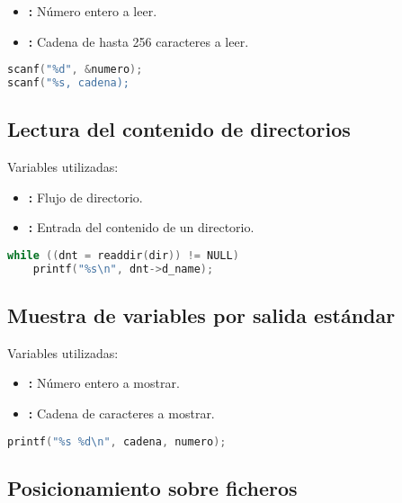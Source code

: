 \begin{itemize}
	\item{}\textbf{:} Número entero a leer.
	\item{}\textbf{:} Cadena de hasta 256 caracteres a leer.
\end{itemize}

\begin{lstlisting}[language=C]
scanf("%d", &numero);
scanf("%s, cadena);
\end{lstlisting}

\subsection{Lectura del contenido de directorios}

Variables utilizadas:

\begin{itemize}
	\item{}\textbf{:} Flujo de directorio.
	\item{}\textbf{:} Entrada del contenido de un directorio.
\end{itemize}

\begin{lstlisting}[language=C]
while ((dnt = readdir(dir)) != NULL)
	printf("%s\n", dnt->d_name);
\end{lstlisting}

\pagebreak

\subsection{Muestra de variables por salida estándar}

Variables utilizadas:

\begin{itemize}
	\item{}\textbf{:} Número entero a mostrar.
	\item{}\textbf{:} Cadena de caracteres a mostrar.
\end{itemize}

\begin{lstlisting}[language=C]
printf("%s %d\n", cadena, numero);
\end{lstlisting}

\subsection{Posicionamiento sobre ficheros}

